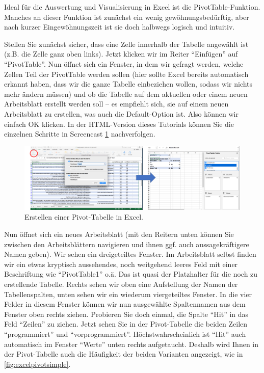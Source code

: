 \documentclass[]{article}
\begin{document}
Ideal für die Auswertung und Visualisierung in Excel ist die
PivotTable-Funktion. Manches an dieser Funktion ist zunächst ein wenig
gewöhnungsbedürftig, aber nach kurzer Eingewöhnungszeit ist sie doch
halbwegs logisch und intuitiv.

Stellen Sie zunächst sicher, dass eine Zelle innerhalb der Tabelle
angewählt ist (z.B. die Zelle ganz oben links). Jetzt klicken wir im
Reiter \enquote{Einfügen} auf \enquote{PivotTable}. Nun öffnet sich ein
Fenster, in dem wir gefragt werden, welche Zellen Teil der PivotTable
werden sollen (hier sollte Excel bereits automatisch erkannt haben, dass
wir die ganze Tabelle einbeziehen wollen, sodass wir nichts mehr ändern
müssen) und ob die Tabelle auf dem aktuellen oder einem neuen
Arbeitsblatt erstellt werden soll -- es empfiehlt sich, sie auf einem
neuen Arbeitsblatt zu erstellen, was auch die Default-Option ist. Also
können wir einfach OK klicken. In der HTML-Version dieses Tutorials
können Sie die einzelnen Schritte in Screencast \ref{fig:excelpivot}
nachverfolgen.

\begin{figure}
\includegraphics[width=6.66in]{docs/fig/excelpivot} \caption{Erstellen einer Pivot-Tabelle in Excel.}\label{fig:excelpivot}
\end{figure}

Nun öffnet sich ein neues Arbeitsblatt (mit den Reitern unten können Sie
zwischen den Arbeitsblättern navigieren und ihnen ggf. auch
aussagekräftigere Namen geben). Wir sehen ein dreigeteiltes Fenster. Im
Arbeitsblatt selbst finden wir ein etwas kryptisch aussehendes, noch
weitgehend leeres Feld mit einer Beschriftung wie \enquote{PivotTable1}
o.ä. Das ist quasi der Platzhalter für die noch zu erstellende Tabelle.
Rechts sehen wir oben eine Aufstellung der Namen der Tabellenspalten,
unten sehen wir ein wiederum viergeteiltes Fenster. In die vier Felder
in diesem Fenster können wir nun ausgewählte Spaltennamen aus dem
Fenster oben rechts ziehen. Probieren Sie doch einmal, die Spalte
\enquote{Hit} in das Feld \enquote{Zeilen} zu ziehen. Jetzt sehen Sie in
der Pivot-Tabelle die beiden Zeilen \enquote{programmiert} und
\enquote{vorprogrammiert}. Höchstwahrscheinlich ist \enquote{Hit} auch
automatisch im Fenster \enquote{Werte} unten rechts aufgetaucht. Deshalb
wird Ihnen in der Pivot-Tabelle auch die Häufigkeit der beiden Varianten
angezeigt, wie in \ref{fig:excelpivotsimple}.
\end{document}
